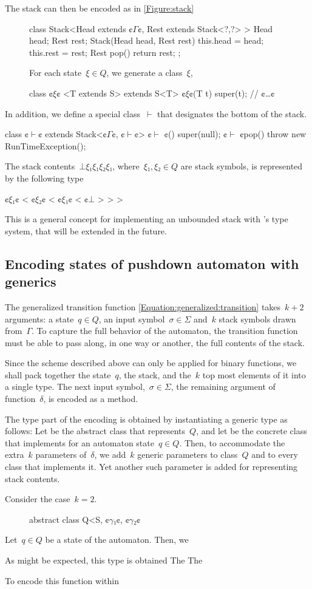 The stack can then be encoded as in \cref{Figure:stack}
\begin{figure}
\begin{JAVA}
class Stack<Head extends ¢$Γ$¢, Rest extends Stack<?,?> > {
  Head head;
  Rest rest;
  Stack(Head head, Rest rest) { this.head = head; this.rest = rest;}
  Rest pop() { return rest; };
}
\end{JAVA}
For each state~$ξ∈Q$, we generate a \Java class~$ξ$,
\begin{JAVA}
class ¢$ξ$¢ <T extends S> extends S<T> {
  ¢$ξ$¢(T t) { super(t); }
  // ¢…¢
}
\end{JAVA}
\end{figure}
In addition, we define a special class~$\vdash$ that designates the bottom of the stack.
\begin{JAVA}
class ¢$\vdash$¢ extends Stack<¢$Γ$¢, ¢$\vdash$¢> {
  ¢$\vdash$ ¢() { super(null); }
  ¢$\vdash$ ¢pop() { throw new RunTimeException(); }
}
\end{JAVA}
The stack contents~$⊥ξ₁ξ₁ξ₂ξ₁$,
where~$ξ₁,ξ₂∈Q$ are stack symbols,
is represented by the following type
\begin{JAVA}
  ¢$ξ₁$¢ < ¢$ξ₂$¢ < ¢$ξ₁$¢ < ¢$⊥$ > > >
\end{JAVA}
This is a general concept for implementing an unbounded stack with \Java's type system,
that will be extended in the future.

\subsection{Encoding states of pushdown automaton with \Java generics}
The generalized transition function \cref{Equation:generalized:transition}
  takes~$k+2$ arguments: a state~$q∈Q$, an input symbol~$σ∈Σ$
    and~$k$ stack symbols drawn from~$Γ$.
To capture the full behavior of the automaton, the transition function
  must be able to pass along, in one way or another, the full contents of the stack.

Since the scheme described above can only be applied for binary functions,
  we shall pack together the state~$q$, the stack, and the~$k$ top most
  elements of it into a single type.
The next input symbol,~$σ∈Σ$, the remaining argument of function~$δ$,
  is encoded as a method.

The type part of the encoding is obtained by instantiating a generic type as follows:
Let  be the abstract class that represents~$Q$, and let  be the concrete class that
  implements  for an automaton state~$q∈Q$.
Then, to accommodate the extra~$k$ parameters of~$δ$, we add~$k$ generic parameters
  to class~$Q$ and to every class  that implements it.
Yet another such parameter is added for representing stack contents.

Consider the case~$k=2$.
\begin{figure}
\begin{JAVA}
abstract class Q<S, ¢$γ₁$¢, ¢$γ₂$¢
\end{JAVA}
\end{figure}

Let~$q∈Q$ be a state of the automaton. Then, we

  As might be expected, this type is obtained
  The
  The

To encode this function within

